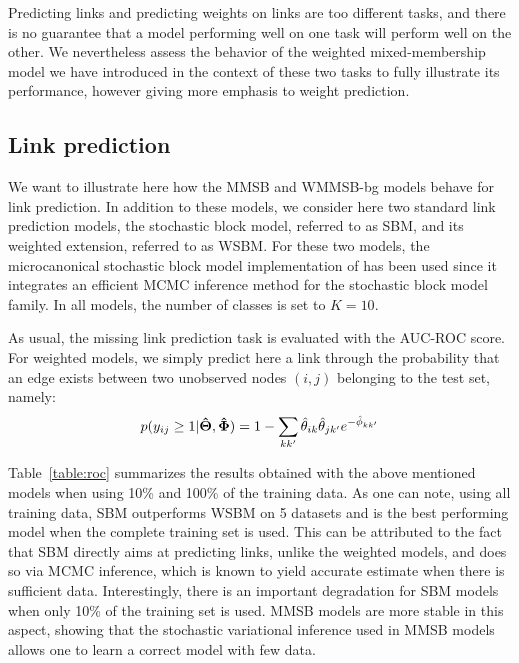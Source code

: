 Predicting links and predicting weights on links are too different tasks, and there is no guarantee that a model performing well on one task will perform well on the other. We nevertheless assess the behavior of the weighted mixed-membership model we have introduced in the context of these two tasks to fully illustrate its performance, however giving more emphasis to weight prediction.

\subsection{Link prediction}

We want to illustrate here how the MMSB and WMMSB-bg models behave for link prediction. In addition to these models, we consider here two standard link prediction models, the stochastic block model, referred to as SBM, and its weighted extension, referred to as WSBM. For these two models, the microcanonical stochastic block model implementation of \cite{peixoto2018nonparametric} has been used since it integrates an efficient MCMC inference method for the stochastic block model family.  In all models, the number of classes is set to $K=10$. 

As usual, the missing link prediction task is evaluated with the AUC-ROC score. For weighted models, we simply predict here a link through the probability that an edge exists between two unobserved nodes $(i,j)$ belonging to the test set, namely:
\[
p(y_{ij} \geq 1 | \boldsymbol{\hat\Theta}, \boldsymbol{\hat\Phi}) = 1 - \sum_{kk'} \hat\theta_{ik} \hat\theta_{jk'} e^{-\hat\phi_{kk'}}
\]


Table~\ref{table:roc} summarizes the results obtained with the above mentioned models when using 10\% and 100\% of the training data. As one can note, using all training data, SBM outperforms WSBM on 5 datasets and is the best performing model when the complete training set is used. This can be attributed to the fact that SBM directly aims at predicting links, unlike the weighted models, and does so via MCMC inference, which is known to yield accurate estimate when there is sufficient data. Interestingly, there is an important degradation for SBM models when only 10\% of the training set is used. MMSB models are more stable in this aspect, showing that the stochastic variational inference used in MMSB models allows one to learn a correct model with few data.

